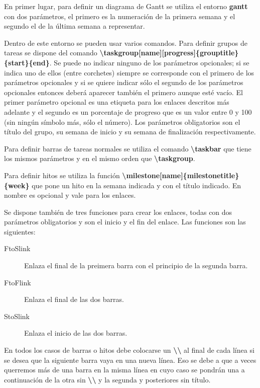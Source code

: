 En primer lugar, para definir un diagrama de Gantt se utiliza el entorno \textbf{gantt} con dos parámetros, el primero es la numeración de la primera semana y el segundo el de la última semana a representar.

Dentro de este entorno se pueden usar varios comandos. Para definir grupos de tareas se dispone del comando \textbf{\textbackslash taskgroup[name][progress]\{grouptitle\}\{start\}\{end\}}. Se puede no indicar ninguno de los parámetros opcionales; si se indica uno de ellos (entre corchetes) siempre se corresponde con el primero de los parámetros opcionales y si se quiere indicar sólo el segundo de los parámetros opcionales entonces deberá aparecer también el primero aunque esté vacío. El primer parámetro opcional es una etiqueta para los enlaces descritos más adelante y el segundo es un porcentaje de progreso que es un valor entre 0 y 100 (sin ningún símbolo más, sólo el número). Los parámetros obligatorios son el título del grupo, su semana de inicio y su semana de finalización respectivamente.

Para definir barras de tareas normales se utiliza el comando \textbf{\textbackslash taskbar} que tiene los mismos parámetros y en el mismo orden que \textbf{\textbackslash taskgroup}.

Para definir hitos se utiliza la función \textbf{\textbackslash milestone[name]\{milestonetitle\}\{week\}} que pone un hito en la semana indicada y con el título indicado. En nombre es opcional y vale para los enlaces.

Se dispone también de tres funciones para crear los enlaces, todas con dos parámetros obligatorios y son el inicio y el fin del enlace. Las funciones son las siguientes:
\begin{description}
  \item [FtoSlink] Enlaza el final de la preimera barra con el principio de la segunda barra.
  \item [FtoFlink] Enlaza el final de las dos barras.
  \item [StoSlink] Enlaza el inicio de las dos barras.
\end{description}

En todos los casos de barras o hitos debe colocarse un \textbf{\textbackslash\textbackslash} al final de cada línea si se desea que la siguiente barra vaya en una nueva línea. Eso se debe a que a veces querremos más de una barra en la misma línea en cuyo caso se pondrán una a continuación de la otra sin \textbf{\textbackslash\textbackslash} y la segunda y posteriores sin título.
